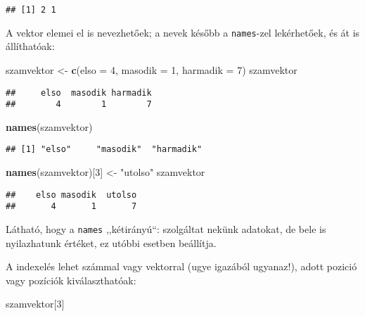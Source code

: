 \documentclass[]{book}
\newenvironment{Shaded}{\begin{snugshade}}{\end{snugshade}}
\newcommand{\DataTypeTok}[1]{\textcolor[rgb]{0.13,0.29,0.53}{#1}}
\newcommand{\DecValTok}[1]{\textcolor[rgb]{0.00,0.00,0.81}{#1}}
\newcommand{\KeywordTok}[1]{\textcolor[rgb]{0.13,0.29,0.53}{\textbf{#1}}}
\newcommand{\NormalTok}[1]{#1}
\newcommand{\StringTok}[1]{\textcolor[rgb]{0.31,0.60,0.02}{#1}}
\begin{document}
\begin{verbatim}
## [1] 2 1
\end{verbatim}

A vektor elemei el is nevezhetőek; a nevek később a \texttt{names}-zel lekérhetőek, és át is állíthatóak:

\begin{Shaded}
\begin{Highlighting}[]
\NormalTok{szamvektor <-}\StringTok{ }\KeywordTok{c}\NormalTok{(}\DataTypeTok{elso =} \DecValTok{4}\NormalTok{, }\DataTypeTok{masodik =} \DecValTok{1}\NormalTok{, }\DataTypeTok{harmadik =} \DecValTok{7}\NormalTok{)}
\NormalTok{szamvektor}
\end{Highlighting}
\end{Shaded}

\begin{verbatim}
##     elso  masodik harmadik 
##        4        1        7
\end{verbatim}

\begin{Shaded}
\begin{Highlighting}[]
\KeywordTok{names}\NormalTok{(szamvektor)}
\end{Highlighting}
\end{Shaded}

\begin{verbatim}
## [1] "elso"     "masodik"  "harmadik"
\end{verbatim}

\begin{Shaded}
\begin{Highlighting}[]
\KeywordTok{names}\NormalTok{(szamvektor)[}\DecValTok{3}\NormalTok{] <-}\StringTok{ "utolso"}
\NormalTok{szamvektor}
\end{Highlighting}
\end{Shaded}

\begin{verbatim}
##    elso masodik  utolso 
##       4       1       7
\end{verbatim}

Látható, hogy a \texttt{names} ,,kétirányú``: szolgáltat nekünk adatokat, de bele is nyilazhatunk értéket, ez utóbbi esetben beállítja.

A indexelés lehet számmal vagy vektorral (ugye igazából ugyanaz!), adott pozició vagy pozíciók kiválaszthatóak:

\begin{Shaded}
\begin{Highlighting}[]
\NormalTok{szamvektor[}\DecValTok{3}\NormalTok{]}
\end{Highlighting}
\end{Shaded}
\end{document}
